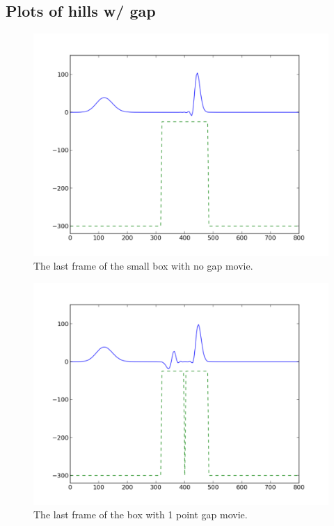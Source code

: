 \documentclass[twoside]{article}
\begin{document}
\subsection{Plots of hills w/ gap}
\begin{figure} 
  \centering
  \includegraphics[scale=0.4]{PdfImages/1d_box_final.pdf}
  \caption{The last frame of the small box with no gap movie.} \label{fig:box_1d_small}
\end{figure}

\begin{figure} 
  \centering
  \includegraphics[scale=0.4]{PdfImages/1d_box_slit1_final.pdf}
  \caption{The last frame of the box with 1 point gap movie.} \label{fig:box_1d_}
\end{figure}
\end{document}
